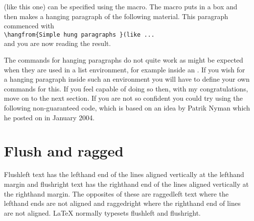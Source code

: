 (like this one) can be specified
using the \cmd{\hangfrom} macro. The macro puts  in a box
and then makes a hanging paragraph of the following material. This
paragraph commenced with \\
\verb?\hangfrom{Simple hung paragraphs }(like ...? \\
and you are now reading the result.

    The commands for hanging paragraphs do not quite work as might be
expected when they are used in a list 
environment, for example inside
an . If you wish for a hanging paragraph inside such an
environment you will have to define your own commands for this. If you
feel capable of doing so then, with my congratulations, move on to the
next section. If you are not so confident you could try using the following
non-guaranteed code, which is based on an idea by Patrik 
Nyman which he posted on \ctt{} in January 2004.
  



\section{Flush and ragged}

    Flushleft text has the lefthand end of the lines 
aligned vertically at the lefthand margin and
flushright text has the righthand end of the lines 
aligned vertically at the righthand margin. The
opposites of these are raggedleft text where the 
lefthand ends are not aligned
and raggedright where the righthand end of lines are 
not aligned. LaTeX normally typesets flushleft and flushright.

